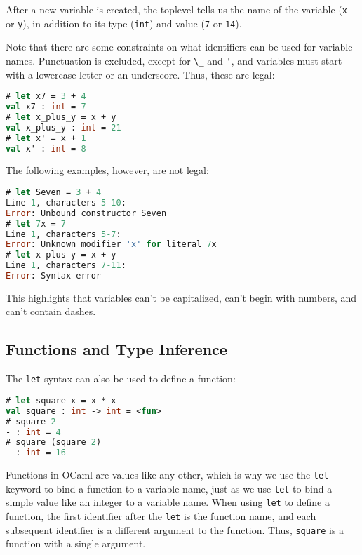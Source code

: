 After a new variable is created, the toplevel tells us the name of the
variable (\passthrough{\lstinline!x!} or \passthrough{\lstinline!y!}),
in addition to its type (\passthrough{\lstinline!int!}) and value
(\passthrough{\lstinline!7!} or \passthrough{\lstinline!14!}).

Note that there are some constraints on what identifiers can be used for
variable names. Punctuation is excluded, except for
\passthrough{\lstinline!\_!} and \passthrough{\lstinline!'!}, and
variables must start with a lowercase letter or an underscore. Thus,
these are legal:

\begin{lstlisting}[language=Caml]
# let x7 = 3 + 4
val x7 : int = 7
# let x_plus_y = x + y
val x_plus_y : int = 21
# let x' = x + 1
val x' : int = 8
\end{lstlisting}

The following examples, however, are not legal:

\begin{lstlisting}[language=Caml]
# let Seven = 3 + 4
Line 1, characters 5-10:
Error: Unbound constructor Seven
# let 7x = 7
Line 1, characters 5-7:
Error: Unknown modifier 'x' for literal 7x
# let x-plus-y = x + y
Line 1, characters 7-11:
Error: Syntax error
\end{lstlisting}

This highlights that variables can't be capitalized, can't begin with
numbers, and can't contain dashes.

\hypertarget{functions-and-type-inference}{%
\subsection{Functions and Type
Inference}\label{functions-and-type-inference}}

The \passthrough{\lstinline!let!} syntax can also be used to define a
function:

\begin{lstlisting}[language=Caml]
# let square x = x * x
val square : int -> int = <fun>
# square 2
- : int = 4
# square (square 2)
- : int = 16
\end{lstlisting}

Functions in OCaml are values like any other, which is why we use the
\passthrough{\lstinline!let!} keyword to bind a function to a variable
name, just as we use \passthrough{\lstinline!let!} to bind a simple
value like an integer to a variable name. When using
\passthrough{\lstinline!let!} to define a function, the first identifier
after the \passthrough{\lstinline!let!} is the function name, and each
subsequent identifier is a different argument to the function. Thus,
\passthrough{\lstinline!square!} is a function with a single argument.

